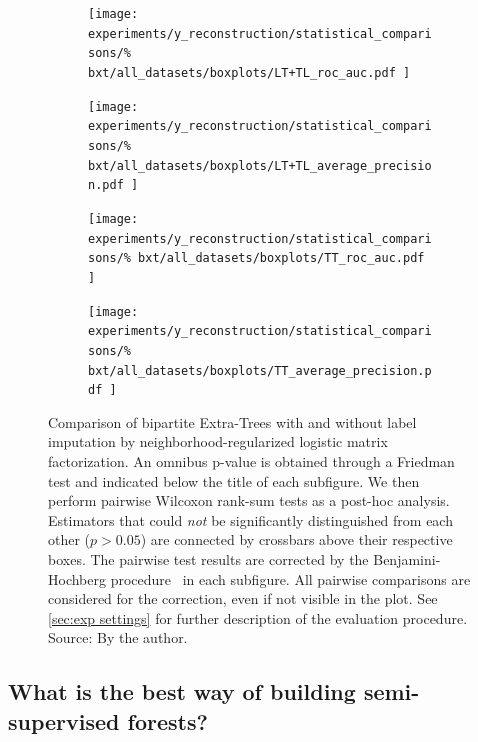 \begin{figure}[tb]
    \centering
    \begin{subfigure}{0.49\textwidth}
        \texttt{[image: 
            experiments/y\_reconstruction/statistical\_comparisons/\%
            bxt/all\_datasets/boxplots/LT+TL\_roc\_auc.pdf
        ]}
    \end{subfigure}
    \begin{subfigure}{0.49\textwidth}
        \texttt{[image: 
            experiments/y\_reconstruction/statistical\_comparisons/\%
            bxt/all\_datasets/boxplots/LT+TL\_average\_precision.pdf
        ]}
    \end{subfigure}

    \begin{subfigure}{0.49\textwidth}
        \texttt{[image: 
            experiments/y\_reconstruction/statistical\_comparisons/\%
            bxt/all\_datasets/boxplots/TT\_roc\_auc.pdf
        ]}
    \end{subfigure}
    \begin{subfigure}{0.49\textwidth}
        \texttt{[image: 
            experiments/y\_reconstruction/statistical\_comparisons/\%
            bxt/all\_datasets/boxplots/TT\_average\_precision.pdf
        ]}
    \end{subfigure}
    \caption{
        Comparison of bipartite Extra-Trees with and without label imputation by neighborhood-regularized logistic matrix factorization.
        An omnibus p-value is obtained through a Friedman test and indicated below the title of each subfigure.
        We then perform pairwise Wilcoxon rank-sum tests as a post-hoc analysis.
        Estimators that could \emph{not} be significantly distinguished from each other ($p > 0.05$) are connected by crossbars above their respective boxes. 
        The pairwise test results are corrected by the Benjamini-Hochberg procedure~\cite{benjamini1995controlling,haynes2013benjamini} in each subfigure. All pairwise comparisons are considered for the correction, even if not visible in the plot.
        See \autoref{sec:exp settings} for further description of the evaluation procedure. \newline Source: By the author.
    }
    \label{fig:bxt_y_reconstruction}
\end{figure}



\subsection{What is the best way of building semi-supervised forests?}
\label{sec:ss_comparison}

